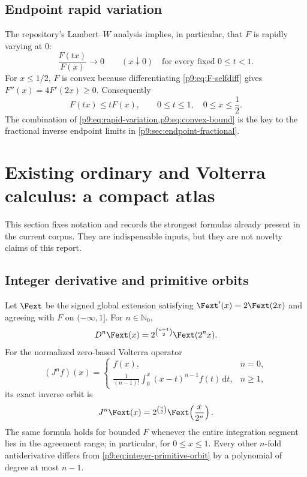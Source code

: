 \documentclass[11pt,oneside]{article}
\theoremstyle{definition}
\theoremstyle{remark}
\newcommand{\N}{\mathbb N}
\newcommand{\dd}{\,\mathrm d}
\newcommand{\1}{\mathbf 1}
\begin{document}
\subsection{Endpoint rapid variation}

The repository's Lambert--$W$ analysis implies, in particular, that $F$ is
rapidly varying at $0$:
\begin{equation}
 \frac{F(tx)}{F(x)}\longrightarrow0
 \qquad(x\downarrow0)
 \quad\text{for every fixed }0\le t<1.
 \label{p9:eq:rapid-variation}
\end{equation}
For $x\le1/2$, $F$ is convex because differentiating
\cref{p9:eq:F-selfdiff} gives $F''(x)=4F'(2x)\ge0$.  Consequently
\begin{equation}
 F(tx)\le tF(x),
 \qquad 0\le t\le1,
 \quad 0\le x\le\frac12.
 \label{p9:eq:convex-bound}
\end{equation}
The combination of \cref{p9:eq:rapid-variation,p9:eq:convex-bound} is the key to the
fractional inverse endpoint limits in \cref{p9:sec:endpoint-fractional}.

\section{Existing ordinary and Volterra calculus: a compact atlas}
\label{p9:sec:baseline-atlas}

This section fixes notation and records the strongest formulas already present
in the current corpus.  They are indispensable inputs, but they are not
novelty claims of this report.

\subsection{Integer derivative and primitive orbits}

Let $\Fext$ be the signed global extension satisfying
$\Fext'(x)=2\Fext(2x)$ and agreeing with $F$ on $(-\infty,1]$.  For
$n\in\N_0$,
\begin{equation}
 D^n\Fext(x)=2^{\binom{n+1}{2}}\Fext(2^nx).
 \label{p9:eq:integer-derivative-orbit}
\end{equation}
For the normalized zero-based Volterra operator
\begin{equation}
 (J^nf)(x)=
 \begin{cases}
 f(x),&n=0,\\[1mm]
 \displaystyle\frac1{(n-1)!}\int_0^x(x-t)^{n-1}f(t)\dd t,&n\ge1,
 \end{cases}
 \label{p9:eq:J-def}
\end{equation}
its exact inverse orbit is
\begin{equation}
 J^n\Fext(x)=2^{\binom n2}\Fext\!\left(\frac{x}{2^n}\right).
 \label{p9:eq:integer-primitive-orbit}
\end{equation}
The same formula holds for bounded $F$ whenever the entire integration segment
lies in the agreement range; in particular, for $0\le x\le1$.
Every other $n$-fold antiderivative differs from \cref{p9:eq:integer-primitive-orbit}
by a polynomial of degree at most $n-1$.
\end{document}
